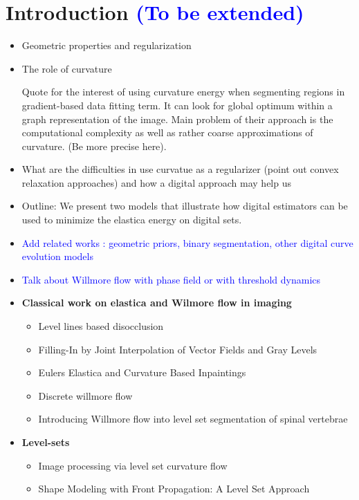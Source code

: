 \documentclass[runningheads]{llncs}
\newcommand{\todo}[1]{{\textcolor{blue}{#1}}}
\begin{document}
\section{Introduction \todo{(To be extended)}}
\begin{itemize}
	\item{Geometric properties and regularization}
	\item{The role of curvature} 
	
	Quote \cite{schoenemann2011elastic} for the interest of using curvature energy when segmenting regions in gradient-based data fitting term. It can look for global optimum within a graph representation of the image. Main problem of their approach is the computational complexity as well as rather coarse approximations of curvature. (Be more precise here).
	
	\item{What are the difficulties in use curvatue as a regularizer (point out convex relaxation approaches) and how a digital approach may help us }
	\item{Outline: We present two models that illustrate how digital estimators can be used to minimize the elastica energy on digital sets.  }
	\item{\todo{Add related works : geometric priors, binary segmentation, other digital curve evolution models}}
	\item{\todo{Talk about Willmore flow with phase field or with threshold dynamics}}
	
	\item{\textbf{Classical work on elastica and Wilmore flow in imaging}}
	\begin{itemize}
		\item{Level lines based disocclusion \cite{masnou98inpainting} }	
		\item{Filling-In by Joint Interpolation of Vector Fields and Gray Levels \cite{ballester01filljoint} }
		\item{Eulers Elastica and Curvature Based Inpaintings \cite{chan02elasticainpainting} }
		\item{Discrete willmore flow \cite{bobenko2005discrete}}
		\item{Introducing Willmore flow into level set segmentation of spinal vertebrae \cite{lim2012introducing}}	
	\end{itemize}

	\item{\textbf{Level-sets}}
	\begin{itemize}
		\item{Image processing via level set curvature flow \cite{malladi1995image} }
		\item{Shape Modeling with Front Propagation: A Level Set Approach \cite{malladi1995shape} }	
	\end{itemize}	


\end{itemize}
\end{document}
